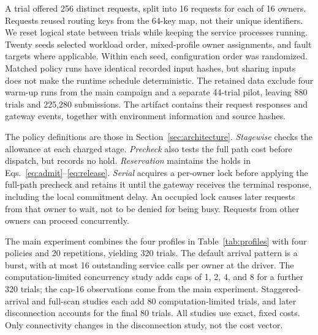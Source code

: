 A trial offered 256 distinct requests, split into 16 requests for each of
16 owners. Requests reused routing keys from the 64-key map, not their unique
identifiers. We reset logical state between trials while keeping the service
processes running. Twenty seeds selected workload order, mixed-profile owner
assignments, and fault targets where applicable. Within each seed, configuration
order was randomized. Matched policy runs have identical recorded input hashes,
but sharing inputs does not make the runtime schedule deterministic. The
retained data exclude four warm-up runs from the main campaign and a separate
44-trial pilot, leaving 880 trials and 225,280 submissions. The artifact
contains their request responses and gateway events, together with environment
information and source hashes.

The policy definitions are those in Section~\ref{sec:architecture}.
\emph{Stagewise} checks the allowance at each charged stage. \emph{Precheck}
also tests the full path cost before dispatch, but records no hold.
\emph{Reservation} maintains the holds in
Eqs.~\eqref{eq:admit}--\eqref{eq:release}. \emph{Serial} acquires a per-owner
lock before applying the full-path precheck and retains it until the gateway
receives the terminal response, including the local commitment delay.
An occupied lock causes later requests from that owner to wait, not to be
denied for being busy. Requests from other owners can proceed concurrently.

The main experiment combines the four profiles in Table~\ref{tab:profiles}
with four policies and 20 repetitions, yielding 320 trials. The default
arrival pattern is a burst, with at most 16 outstanding service calls per
owner at the driver. The computation-limited concurrency study adds caps of
1, 2, 4, and 8 for a further 320 trials; the cap-16 observations come from
the main experiment. Staggered-arrival and full-scan studies each add 80
computation-limited trials, and later disconnection accounts for the final
80 trials. All studies use exact, fixed costs. Only connectivity changes
in the disconnection study, not the cost vector.


